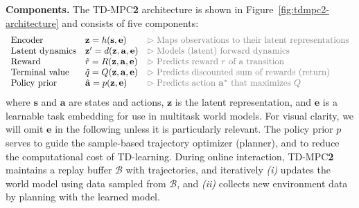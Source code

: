 \documentclass{article}
\begin{document}
\textbf{Components.} The TD-MPC\textbf{2} architecture is shown in Figure~\ref{fig:tdmpc2-architecture} and consists of five components:
\begin{equation}
    \label{eq:tdmpc-components}
    \begin{array}{lll}
        \text{Encoder} & \mathbf{z} = h(\mathbf{s}, \mathbf{e}) & \color{gray}{\vartriangleright\text{Maps observations to their latent representations}}\\
        \text{Latent dynamics} & \mathbf{z}' = d(\mathbf{z}, \mathbf{a}, \mathbf{e}) & \color{gray}{\vartriangleright\text{Models (latent) forward dynamics}}\\
        \text{Reward} & \hat{r} = R(\mathbf{z}, \mathbf{a}, \mathbf{e}) & \color{gray}{\vartriangleright\text{Predicts reward $r$ of a transition}}\\
        \text{Terminal value} & \hat{q} = Q(\mathbf{z}, \mathbf{a}, \mathbf{e}) & \color{gray}{\vartriangleright\text{Predicts discounted sum of rewards (return)}}\\
        \text{Policy prior} & \hat{\mathbf{a}} = p(\mathbf{z}, \mathbf{e}) & \color{gray}{\vartriangleright\text{Predicts action $\mathbf{a}^{*}$ that maximizes $Q$}}
    \end{array}
\end{equation}
where $\mathbf{s}$ and $\mathbf{a}$ are states and actions, $\mathbf{z}$ is the latent representation, and $\mathbf{e}$ is a learnable task embedding for use in multitask world models. For visual clarity, we will omit $\mathbf{e}$ in the following unless it is particularly relevant. The policy prior $p$ serves to guide the sample-based trajectory optimizer (planner), and to reduce the computational cost of TD-learning. During online interaction, TD-MPC\textbf{2} maintains a replay buffer $\mathcal{B}$ with trajectories, and iteratively \emph{(i)} updates the world model using data sampled from $\mathcal{B}$, and \emph{(ii)} collects new environment data by planning with the learned model.
\end{document}

